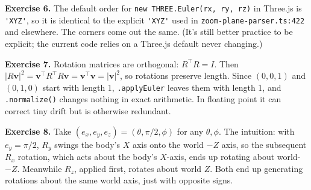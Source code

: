\documentclass{article}
\begin{document}
\textbf{Exercise 6.} The default order for \lstinline|new THREE.Euler(rx, ry, rz)|
in Three.js is \lstinline|'XYZ'|, so it is identical to the explicit
\lstinline|'XYZ'| used in \texttt{zoom-plane-parser.ts:422} and elsewhere.
The corners come out the same. (It's still better practice to be explicit;
the current code relies on a Three.js default never changing.)

\textbf{Exercise 7.} Rotation matrices are orthogonal: $R^\top R = I$. Then
$|R\mathbf{v}|^2 = \mathbf{v}^\top R^\top R \mathbf{v} = \mathbf{v}^\top \mathbf{v} = |\mathbf{v}|^2$,
so rotations preserve length. Since $(0,0,1)$ and $(0,1,0)$ start with
length 1, \lstinline|.applyEuler| leaves them with length 1, and
\lstinline|.normalize()| changes nothing in exact arithmetic. In floating
point it can correct tiny drift but is otherwise redundant.

\textbf{Exercise 8.} Take $(e_x, e_y, e_z) = (\theta, \pi/2, \phi)$ for any
$\theta, \phi$. The intuition: with $e_y = \pi/2$, $R_y$ swings the body's
$X$ axis onto the world $-Z$ axis, so the subsequent $R_x$ rotation, which
acts about the body's $X$-axis, ends up rotating about world-$-Z$.
Meanwhile $R_z$, applied first, rotates about world $Z$. Both end up
generating rotations about the same world axis, just with opposite signs.
\end{document}
